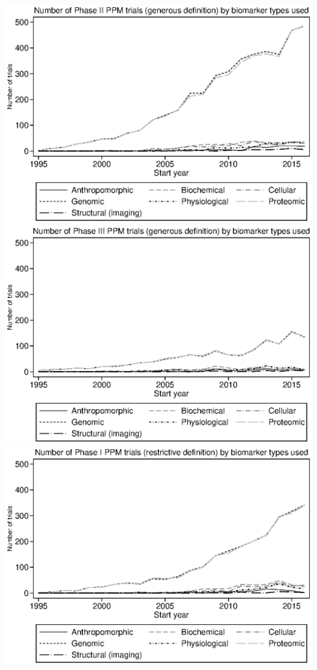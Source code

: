 \includegraphics{../figures/04b-trial_count_by_type_g_ppm_phase_2.eps}
\includegraphics{../figures/04c-trial_count_by_type_g_ppm_phase_3.eps}
\includegraphics{../figures/04d-trial_count_by_type_r_ppm_phase_1.eps}
